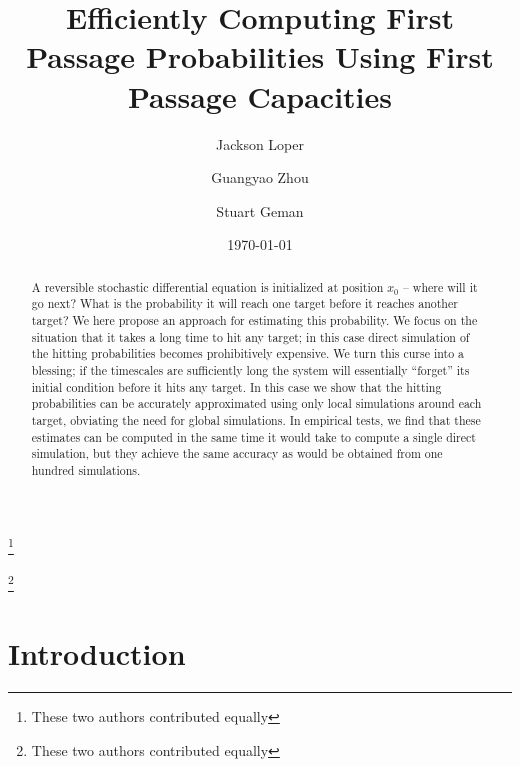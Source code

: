 \documentclass[12pt, nofootinbib,english, amsmath, amssymb, aps, priprint, graphicx,floatfix]{revtex4-1}
\theoremstyle{plain}
\theoremstyle{definition}
\theoremstyle{plain}
\begin{document}
\title{Efficiently Computing First Passage Probabilities Using First Passage Capacities} %

\author{Jackson Loper}
\thanks{These two authors contributed equally}

\author{Guangyao Zhou}
\thanks{These two authors contributed equally}

\author{Stuart Geman}

\date{\today}

\begin{abstract}
	A reversible stochastic differential equation is initialized at position $x_0$ -- where will it go next?  What is the probability it will reach one target before it reaches another target?  We here propose an approach for estimating this probability.  We focus on the situation that it takes a long time to hit any target; in this case direct simulation of the hitting probabilities becomes prohibitively expensive.  We turn this curse into a blessing; if the timescales are sufficiently long the system will essentially ``forget'' its initial condition before it hits any target.  In this case we show that the hitting probabilities can be accurately approximated using only local simulations around each target, obviating the need for global simulations.  In empirical tests, we find that these estimates can be computed in the same time it would take to compute a single direct simulation, but they achieve the same accuracy as would be obtained from one hundred simulations.
\end{abstract}

\pacs{}%

\maketitle %

\section{Introduction}
\label{sec:Introduction}
\end{document}
